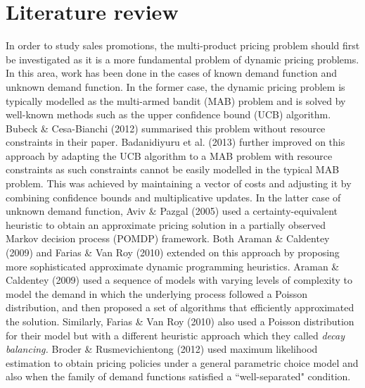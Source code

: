 \documentclass[a4paper]{article}
\begin{document}
\section{Literature review}
In order to study sales promotions, the multi-product pricing problem should first be investigated as it is a more fundamental problem of dynamic pricing problems. In this area, work has been done in the cases of known demand function and unknown demand function. In the former case, the dynamic pricing problem is typically modelled as the multi-armed bandit (MAB) problem and is solved by well-known methods such as the upper confidence bound (UCB) algorithm. Bubeck \& Cesa-Bianchi (2012) summarised this problem without resource constraints in their paper. Badanidiyuru et al. (2013) further improved on this approach by adapting the UCB algorithm to a MAB problem with resource constraints as such constraints cannot be easily modelled in the typical MAB problem. This was achieved by maintaining a vector of costs and adjusting it by combining confidence bounds and multiplicative updates. 
\newline
\newline
In the latter case of unknown demand function, Aviv \& Pazgal (2005) used a certainty-equivalent heuristic to obtain an approximate pricing solution in a partially observed Markov decision process (POMDP) framework. Both Araman \& Caldentey (2009) and Farias \& Van Roy (2010) extended on this approach by proposing more sophisticated approximate dynamic programming heuristics. Araman \& Caldentey (2009) used a sequence of models with varying levels of complexity to model the demand in which the underlying process followed a Poisson distribution, and then proposed a set of algorithms that efficiently approximated the solution. Similarly, Farias \& Van Roy (2010) also used a Poisson distribution for their model but with a different heuristic approach which they called \textit{decay balancing.} Broder \& Rusmevichientong (2012) used maximum likelihood estimation to obtain pricing policies under a general parametric choice model and also when the family of demand functions satisfied a ``well-separated" condition. 

\end{document}
